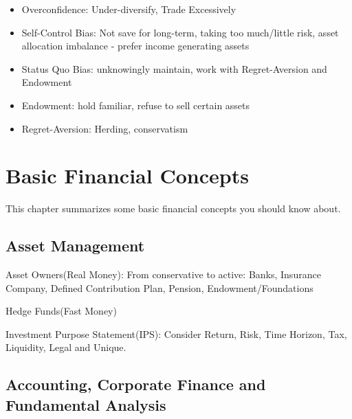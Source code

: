 \documentclass[11pt, openany]{book}              %
\begin{document}
\begin{itemize}
\begin{itemize}
    		\item Overconfidence: Under-diversify, Trade Excessively 
    		\item Self-Control Bias: Not save for long-term, taking too much/little risk, asset allocation imbalance - prefer income generating assets
    		\item Status Quo Bias: unknowingly maintain, work with Regret-Aversion and Endowment
    		\item Endowment: hold familiar, refuse to sell certain assets
    		\item Regret-Aversion: Herding, conservatism
    		\end{itemize}
\end{itemize}


\chapter{Basic Financial Concepts}                %

This chapter summarizes some basic financial concepts you should know about.



\section{Asset Management}

Asset Owners(Real Money): From conservative to active: Banks, Insurance Company, Defined Contribution Plan, Pension, Endowment/Foundations 

Hedge Funds(Fast Money)

Investment Purpose Statement(IPS): Consider Return, Risk, Time Horizon, Tax, Liquidity, Legal and Unique. 

\section{Accounting, Corporate Finance and Fundamental Analysis}
\end{document}
